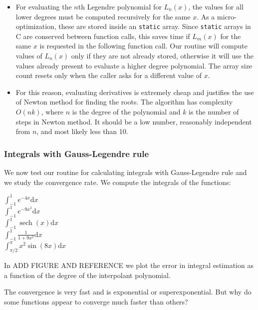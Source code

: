 \documentclass[a4paper,11]{article}
\DeclareMathOperator{\sech}{sech}
\newcommand{\mdcode}[1]{\lstinline[backgroundcolor=\color{gray!10}, frame=single, frameround=tttt]|#1|}
\newcounter{rowcount}
\begin{document}
\begin{itemize}
	\item{
		For evaluating the $n$th Legendre polynomial for $L_{n}(x)$, the values
		for all lower degrees must be computed recursively for the same $x$.
		As a micro-optimization, these are stored inside an \mdcode{static} 
		array. Since \mdcode{static} arrays in C are conserved between 
		function calls, this saves time if $L_{m}(x)$ for the same $x$ 
		is requested in the following function call. Our routine will compute
		values of $L_{n}(x)$ only if they are not already stored, otherwise it
		will use the values already present to evaluate a higher degree
		polynomial. The array size count resets only when the caller 
		asks for a different value of $x$.
	}
	\item{
		For this reason, evaluating derivatives is extremely cheap and justifies
		the use of Newton method for finding the roots. The algorithm has
		complexity $O(nk)$, where $n$ is the degree of the polynomial and 
		$k$ is the number of steps in Newton method. It should be a low 
		number, reasonably independent from $n$, and most likely less than 10.
	}
\end{itemize}

\subsubsection{Integrals with Gauss-Legendre rule}

We now test our routine for calculating integrals with Gauss-Legendre rule and
we study the convergence rate. We compute the integrals of the functions:

\setcounter{rowcount}{0}
\begin{mylist}
$\int^{1}_{-1}e^{-4x}\mathrm d x$ \\
$\int_{-1}^{1}e^{-9x^{2}}\mathrm d x$ \\
$\int^{1}_{-1}\sech(x)\mathrm d x$ \\
$\int^{1}_{-1}\frac{1}{1+9x^{2}}\mathrm d x$ \\
$\int^{\pi}_{\pi/2}x^{2}\sin(8x)\mathrm d x$ \\
\end{mylist}

In ADD FIGURE AND REFERENCE we plot the error in integral estimation as 
a function of the degree of the interpolant polynomial.

The convergence is very fast and is exponential or superexponential.
But why do some functions appear to converge much faster than others?
\end{document}
